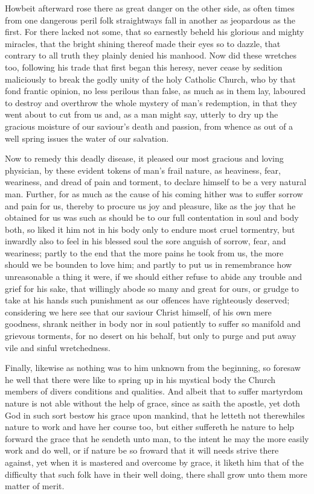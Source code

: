 \documentclass[a5paper]{scrbook}
\begin{document}
	Howbeit afterward rose there as great danger on the other side, as often times from one dangerous peril folk straightways fall in another as jeopardous as the first. For there lacked not some, that so earnestly beheld his glorious and mighty miracles, that the bright shining thereof made their eyes so to dazzle, that contrary to all truth they plainly denied his manhood. Now did these wretches too, following his trade that first began this heresy, never cease by sedition maliciously to break the godly unity of the holy Catholic Church, who by that fond frantic opinion, no less perilous than false, as much as in them lay, laboured to destroy and overthrow the whole mystery of man's redemption, in that they went about to cut from us and, as a man might say, utterly to dry up the gracious moisture of our saviour's death and passion, from whence as out of a well spring issues the water of our salvation.
	
	Now to remedy this deadly disease, it pleased our most gracious and loving physician, by these evident tokens of man's frail nature, as heaviness, fear, weariness, and dread of pain and torment, to declare himself to be a very natural man. Further, for as much as the cause of his coming hither was to suffer sorrow and pain for us, thereby to procure us joy and pleasure, like as the joy that he obtained for us was such as should be to our full contentation in soul and body both, so liked it him not in his body only to endure most cruel tormentry, but inwardly also to feel in his blessed soul the sore anguish of sorrow, fear, and weariness; partly to the end that the more pains he took from us, the more should we be bounden to love him; and partly to put us in remembrance how unreasonable a thing it were, if we should either refuse to abide any trouble and grief for his sake, that willingly abode so many and great for ours, or grudge to take at his hands such punishment as our offences have righteously deserved; considering we here see that our saviour Christ himself, of his own mere goodness, shrank neither in body nor in soul patiently to suffer so manifold and grievous torments, for no desert on his behalf, but only to purge and put away vile and sinful wretchedness.
	
	Finally, likewise as nothing was to him unknown from the beginning, so foresaw he well that there were like to spring up in his mystical body the Church members of divers conditions and qualities. And albeit that to suffer martyrdom nature is not able without the help of grace, since  as saith the apostle,  yet doth God in such sort bestow his grace upon mankind, that he letteth not therewhiles nature to work and have her course too, but either suffereth he nature to help forward the grace that he sendeth unto man, to the intent he may the more easily work and do well, or if nature be so froward that it will needs strive there against, yet when it is mastered and overcome by grace, it liketh him that of the difficulty that such folk have in their well doing, there shall grow unto them more matter of merit.
	
\end{document}
